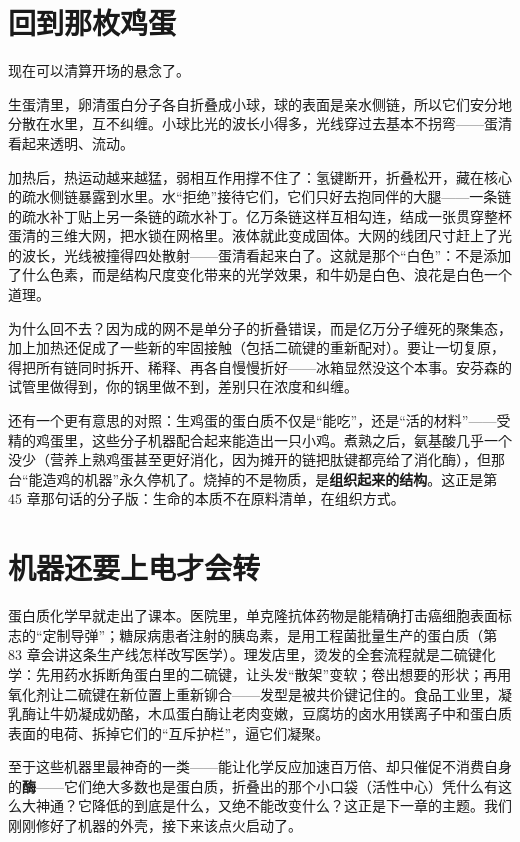\section{回到那枚鸡蛋}

现在可以清算开场的悬念了。

生蛋清里，卵清蛋白分子各自折叠成小球，球的表面是亲水侧链，所以它们安分地分散在水里，互不纠缠。小球比光的波长小得多，光线穿过去基本不拐弯——蛋清看起来透明、流动。

加热后，热运动越来越猛，弱相互作用撑不住了：氢键断开，折叠松开，藏在核心的疏水侧链暴露到水里。水“拒绝”接待它们，它们只好去抱同伴的大腿——一条链的疏水补丁贴上另一条链的疏水补丁。亿万条链这样互相勾连，结成一张贯穿整杯蛋清的三维大网，把水锁在网格里。液体就此变成固体。大网的线团尺寸赶上了光的波长，光线被撞得四处散射——蛋清看起来白了。这就是那个“白色”：不是添加了什么色素，而是结构尺度变化带来的光学效果，和牛奶是白色、浪花是白色一个道理。

为什么回不去？因为成的网不是单分子的折叠错误，而是亿万分子缠死的聚集态，加上加热还促成了一些新的牢固接触（包括二硫键的重新配对）。要让一切复原，得把所有链同时拆开、稀释、再各自慢慢折好——冰箱显然没这个本事。安芬森的试管里做得到，你的锅里做不到，差别只在浓度和纠缠。

还有一个更有意思的对照：生鸡蛋的蛋白质不仅是“能吃”，还是“活的材料”——受精的鸡蛋里，这些分子机器配合起来能造出一只小鸡。煮熟之后，氨基酸几乎一个没少（营养上熟鸡蛋甚至更好消化，因为摊开的链把肽键都亮给了消化酶），但那台“能造鸡的机器”永久停机了。烧掉的不是物质，是\textbf{组织起来的结构}。这正是第 45 章那句话的分子版：生命的本质不在原料清单，在组织方式。

\section{机器还要上电才会转}

蛋白质化学早就走出了课本。医院里，单克隆抗体药物是能精确打击癌细胞表面标志的“定制导弹”；糖尿病患者注射的胰岛素，是用工程菌批量生产的蛋白质（第 83 章会讲这条生产线怎样改写医学）。理发店里，烫发的全套流程就是二硫键化学：先用药水拆断角蛋白里的二硫键，让头发“散架”变软；卷出想要的形状；再用氧化剂让二硫键在新位置上重新铆合——发型是被共价键记住的。食品工业里，凝乳酶让牛奶凝成奶酪，木瓜蛋白酶让老肉变嫩，豆腐坊的卤水用镁离子中和蛋白质表面的电荷、拆掉它们的“互斥护栏”，逼它们凝聚。

至于这些机器里最神奇的一类——能让化学反应加速百万倍、却只催促不消费自身的\textbf{酶}——它们绝大多数也是蛋白质，折叠出的那个小口袋（活性中心）凭什么有这么大神通？它降低的到底是什么，又绝不能改变什么？这正是下一章的主题。我们刚刚修好了机器的外壳，接下来该点火启动了。

